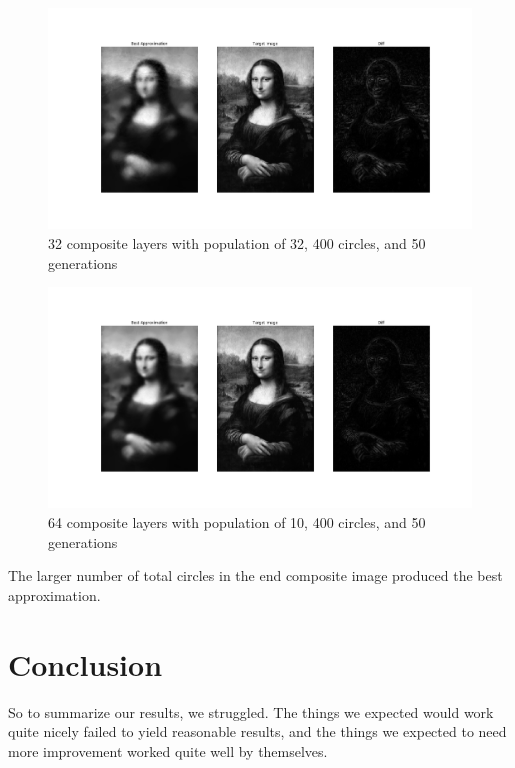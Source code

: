 \documentclass{article}
\begin{document}
\begin{figure}[H]
    \centering
    \includegraphics[width=\textwidth]{output/average32_c400p32g50.png}
    \caption{32 composite layers with population of 32, 400 circles, and 50
        generations}\label{fig:composite-32}
\end{figure}

\begin{figure}[H]
    \centering
    \includegraphics[width=\textwidth]{output/average64_c400p10g50l64.png}
    \caption{64 composite layers with population of 10, 400 circles, and 50
        generations}\label{fig:composite-64-10}
\end{figure}

The larger number of total circles in the end composite image produced the best approximation.

\section{Conclusion}
So to summarize our results, we struggled. The things we expected would work quite nicely failed to
yield reasonable results, and the things we expected to need more improvement worked quite well by
themselves.
\end{document}
